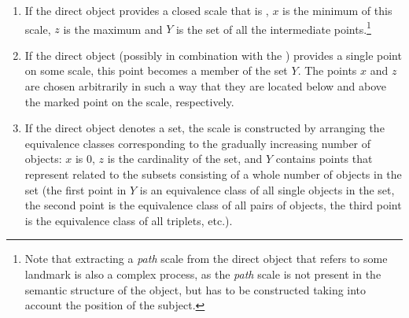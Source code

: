 \begin{enumerate}
\item If the direct object provides a closed scale that is , $x$ is the minimum of this scale, $z$ is the maximum and $Y$ is the set of all the intermediate points.\footnote{Note that extracting a \textit{path} scale from the direct object that refers to some landmark is also a complex process, as the \textit{path} scale is not present in the semantic structure of the object, but has to be constructed taking into account the position of the subject.}
\item If the direct object (possibly in combination with the ) provides a single point on some scale, this point becomes a member of the set $Y$. The points $x$ and $z$ are chosen arbitrarily in such a way that they are located below and above the marked point on the scale, respectively. 
\item If the direct object denotes a set, the scale is constructed by arranging the equivalence classes corresponding to the gradually increasing number of objects: $x$ is 0, $z$ is the cardinality of the set, and $Y$ contains points that represent  related to the subsets consisting of a whole number of objects in the set (the first point in $Y$ is an equivalence class of all single objects in the set, the second point is the equivalence class of all pairs of objects, the third point is the equivalence class of all triplets, etc.).
\end{enumerate}


